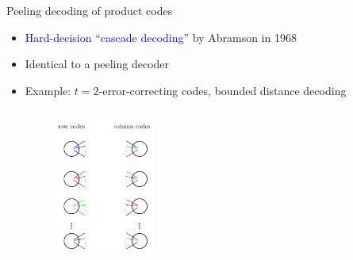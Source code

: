 \begin{frame}{\alert{Peeling} decoding of product codes}

\begin{itemize}
\item \textcolor{blue}{Hard-decision ``cascade decoding''} by Abramson in 1968
\item Identical to a \alert{peeling decoder}
\item Example: $t=2$-error-correcting codes, bounded distance decoding
\end{itemize}

\begin{columns}
\begin{center}
\scalebox{1.2}{}
\end{center}

\begin{figure}[t]
\centering
\includegraphics[width=1.3in]{./Figures/Bipartite_graph}
\end{figure}
\end{columns}
\end{frame}

